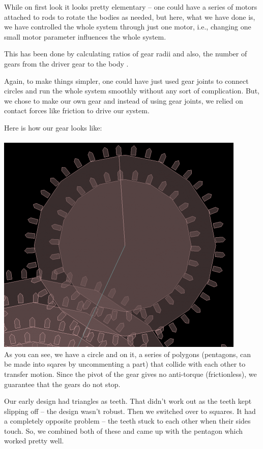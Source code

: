 \documentclass[12pt]{article}
\begin{document}
While on first look it looks pretty elementary -- one could have a series of motors attached to rods to rotate the bodies as needed, but here, what we have done is, we have controlled the whole system through just one motor, i.e., changing one small motor parameter influences the whole system.

This has been done by calculating ratios of gear radii and also, the number of gears from the driver gear to the body \cite{hcv}.

Again, to make things simpler, one could have just used gear joints to connect circles and run the whole system smoothly without any sort of complication. But, we chose to make our own gear and instead of using gear joints, we relied on contact forces like friction to drive our system.

Here is how our gear looks like:
\\ \\
\includegraphics[scale=0.4]{./img/gear.png}
\\
As you can see, we have a circle and on it, a series of polygons (pentagons, can be made into sqares by uncommenting a part) that collide with each other to transfer motion. Since the pivot of the gear gives no anti-torque (frictionless), we guarantee that the gears do not stop. 

Our early design had triangles as teeth. That didn't work out as the teeth kept slipping off -- the design wasn't robust. Then we switched over to squares. It had a completely opposite problem -- the teeth stuck to each other when their sides touch. So, we combined both of these and came up with the pentagon which worked pretty well.
\pagebreak
\end{document}
